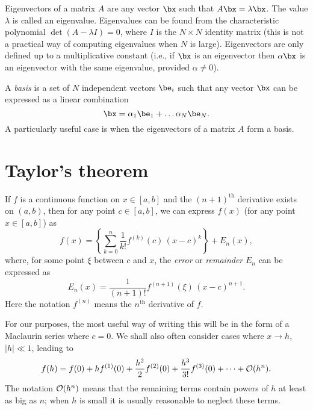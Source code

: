 Eigenvectors of a matrix $A$ are any vector $\bx$ such that $A \bx =
\lambda \bx$. The value $\lambda$ is called an eigenvalue. Eigenvalues
can be found from the characteristic polynomial $\det(A - \lambda I) =
0$, where $I$ is the $N \times N$ identity matrix (this is not a
practical way of computing eigenvalues when $N$ is
large). Eigenvectors are only defined up to a multiplicative constant
(i.e., if $\bx$ is an eigenvector then $\alpha \bx$ is an eigenvector
with the same eigenvalue, provided $\alpha \ne 0$).

A \emph{basis} is a set of $N$ independent vectors $\be_i$ such that
any vector $\bx$ can be expressed as a linear combination
%
\begin{equation}
  \label{eq:key_la4}
  \bx = \alpha_1 \be_1 + \dots \alpha_N \be_N.
\end{equation}
%
A particularly useful case is when the eigenvectors of a matrix $A$
form a basis.

\section{Taylor's theorem}

If $f$ is a continuous function on $x \in [a, b]$ and the
$(n+1)^{\text{th}}$ derivative exists on $(a, b)$, then for any point
$c \in [a, b]$, we can express $f(x)$ (for any point $x \in [a, b]$)
as
%
\begin{equation}
  \label{eq:key_taylor}
  f(x) = \left\{\sum_{k=0}^n \frac{1}{k!} f^{(k)}(c) \, (x - c)^k
  \right\} + E_n(x),
\end{equation}
%
where, for some point $\xi$ between $c$ and $x$, the \emph{error} or
\emph{remainder} $E_n$ can be expressed as
%
\begin{equation}
  \label{eq:key_taylor2}
  E_n(x) = \frac{1}{(n+1)!} f^{(n+1)}(\xi) \, (x - c)^{n+1}.
\end{equation}
%
Here the notation $f^{(n)}$ means the $n^{\text{th}}$ derivative of
$f$.

For our purposes, the most useful way of writing this will be in the
form of a Maclaurin series where $c=0$. We shall also often consider
cases where $x \rightarrow h$, $|h| \ll 1$, leading to
%
\begin{equation}
  \label{eq:key_taylor3}
  f(h) = f(0) + h f^{(1)}(0) + \frac{h^2}{2} f^{(2)}(0) +
  \frac{h^3}{3!} f^{(3)}(0) + \dots + {\cal O}(h^n).
\end{equation}
%
The notation ${\cal O}(h^n)$ means that the remaining terms contain
powers of $h$ at least as big as $n$; when $h$ is small it is usually
reasonable to neglect these terms.

